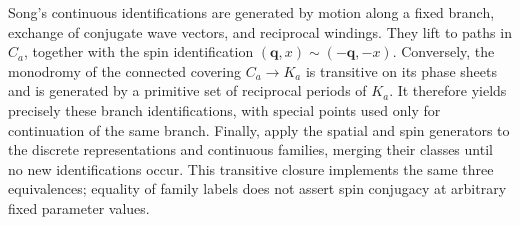 \documentclass{article}
\begin{document}
Song's continuous identifications are generated by motion along a
fixed branch, exchange of conjugate wave vectors, and reciprocal
windings. They lift to paths in $C_a$, together with the spin
identification $(\bm q,x)\sim(-\bm q,-x)$. Conversely, the monodromy
of the connected covering $C_a\to K_a$ is transitive on its phase
sheets and is generated by a primitive set of reciprocal periods
of $K_a$. It therefore yields precisely these branch identifications,
with special points used only for continuation of the same branch.
Finally, apply the spatial and spin generators to the discrete
representations and continuous families, merging their classes until
no new identifications occur. This transitive closure implements the
same three equivalences; equality of family labels does not assert
spin conjugacy at arbitrary fixed parameter values.
\end{document}
